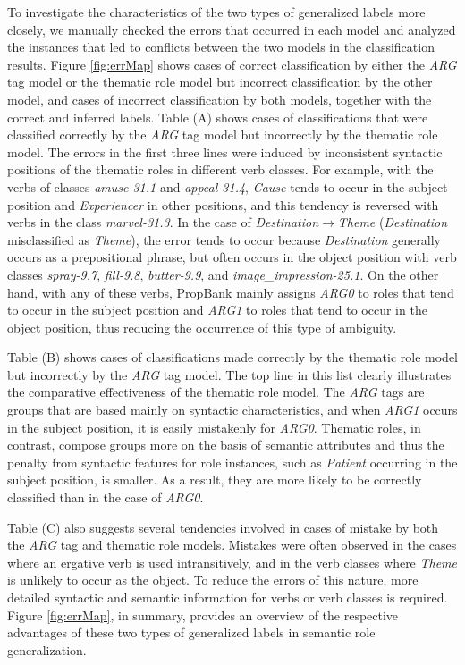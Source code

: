\documentclass[english]{jnlp_1.4_rep}
\begin{document}
To investigate the characteristics of the two types of generalized labels more closely, we manually checked the errors that occurred in each model and analyzed the instances that led to conflicts between the two models in the classification results.
Figure \ref{fig:errMap} shows cases of correct classification by either the {\it ARG} tag model or the thematic role model but incorrect classification by the other model, and cases of incorrect classification by both models, together with the correct and inferred labels. Table (A) shows cases of classifications that were classified correctly by the {\it ARG} tag model but incorrectly by the thematic role model. The errors in the first three lines were induced by inconsistent syntactic positions of the thematic roles in different verb classes. For example, with the verbs of classes {\it amuse-31.1} and {\it appeal-31.4},  {\it Cause} tends to occur in the subject position and {\it Experiencer} in other positions, and this tendency is reversed with verbs in the class {\it marvel-31.3}. In the case of {\it Destination}$\rightarrow${\it Theme} ({\it Destination} misclassified as {\it Theme}), the error tends to occur because {\it Destination} generally occurs as a prepositional phrase, but often occurs in the object position with verb classes {\it spray-9.7}, {\it fill-9.8}, {\it butter-9.9}, and {\it image\_impression-25.1}. On the other hand, with any of these verbs, PropBank mainly assigns {\it ARG0} to roles that tend to occur in the subject position and {\it ARG1} to roles that tend to occur in the object position, thus reducing the occurrence of this type of ambiguity.

Table (B) shows cases of classifications made correctly by the thematic role model but incorrectly by the {\it ARG} tag model. The top line in this list clearly illustrates the comparative effectiveness of the thematic role model. The {\it ARG} tags are groups that are based mainly on syntactic characteristics, and when {\it ARG1} occurs in the subject position, it is easily mistakenly for {\it ARG0}. Thematic roles, in contrast, compose groups more on the basis of semantic attributes and thus the penalty from syntactic features for role instances, such as {\it Patient} occurring in the subject position, is smaller. As a result, they are more likely to be correctly classified than in the case of {\it ARG0}.

Table (C) also suggests several tendencies involved in cases of mistake by both the {\it ARG} tag and thematic role models. Mistakes were often observed in the cases where an ergative verb is used intransitively, and in the verb classes where {\it Theme} is unlikely to occur as the object. To reduce the errors of this nature, more detailed syntactic and semantic information for verbs or verb classes is required.
Figure \ref{fig:errMap}, in summary, provides an overview of the respective advantages of these two types of generalized labels in semantic role generalization.
\end{document}
